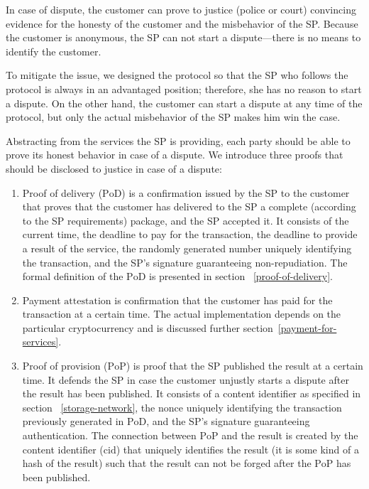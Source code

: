 In case of dispute, the customer can prove to justice (police or court) convincing evidence for the honesty of the customer and the misbehavior of the SP. 
Because the customer is anonymous, the SP can not start a dispute---there is no means to identify the customer.

To mitigate the issue, we designed the protocol so that the SP who follows the protocol is always in an advantaged position; therefore, she has no reason to start a dispute. On the other hand, the customer can start a dispute at any time of the protocol, but only the actual misbehavior of the SP makes him win the case.

Abstracting from the services the SP is providing, each party should be able to prove its honest behavior in case of a dispute. We introduce three proofs that should be disclosed to justice in case of a dispute:

\begin{enumerate}
    \item Proof of delivery ($\mathrm{PoD}$) is a confirmation issued by the SP to the customer that proves that the customer has delivered to the SP a complete (according to the SP requirements) package, and the SP accepted it. It consists of the current time, the deadline to pay for the transaction, the deadline to provide a result of the service, the randomly generated number uniquely identifying the transaction, and the SP's signature guaranteeing non-repudiation. The formal definition of the $\mathrm{PoD}$ is presented in section ~\ref{proof-of-delivery}.
    
    \item Payment $\mathrm{attestation}$ is confirmation that the customer has paid for the transaction at a certain time. The actual implementation depends on the particular cryptocurrency and is discussed further section~\ref{payment-for-services}.
    
    \item Proof of provision ($\mathrm{PoP}$) is proof that the SP published the result at a certain time. It defends the SP in case the customer unjustly starts a dispute after the result has been published. It consists of a content identifier as specified in section ~\ref{storage-network}, the $\mathrm{nonce}$ uniquely identifying the transaction previously generated in $\mathrm{PoD}$, and the SP's signature guaranteeing authentication. The connection between $\mathrm{PoP}$ and the result is created by the content identifier ($\mathrm{cid}$) that uniquely identifies the result (it is some kind of a hash of the result) such that the result can not be forged after the $\mathrm{PoP}$ has been published.
\end{enumerate}

